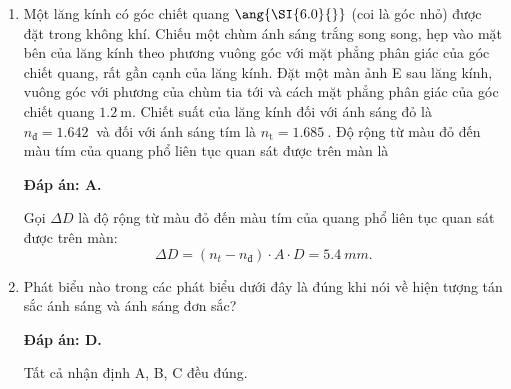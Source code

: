 \begin{enumerate}[label=\bfseries Câu \arabic*:]
{	}
	
	\item {} 
		\cauhoi
	{Một lăng kính có góc chiết quang $\ang{\SI{6.0}{}}$ (coi là góc nhỏ) được đặt trong không khí. Chiếu một chùm ánh sáng trắng song song, hẹp vào mặt bên của lăng kính theo phương vuông góc với mặt phẳng phân giác của góc chiết quang, rất gần cạnh của lăng kính. Đặt một màn ảnh E sau lăng kính, vuông góc với phương của chùm tia tới và cách mặt phẳng phân giác của góc chiết quang $\SI{1.2}{\meter}$. Chiết suất của lăng kính đối với ánh sáng đỏ là $n_\text{đ}=\SI{1.642}{}$ và đối với ánh sáng tím là $n_\text{t}=\SI{1.685}{}$. Độ rộng từ màu đỏ đến màu tím của quang phổ liên tục quan sát được trên màn là
	}
	
	\loigiai
	{		\textbf{Đáp án: A.}
		
Gọi $ \Delta D $ là độ rộng từ màu đỏ đến màu tím của quang phổ liên tục quan sát được trên màn: 
$$
	\Delta D = (n_{t} - n_{\text{đ}})\cdot A \cdot D = \SI{5,4}{mm}.
$$
		
	}
	
	\item {}
		\cauhoi
	{Phát biểu nào trong các phát biểu dưới đây là đúng khi nói về hiện tượng tán sắc ánh sáng và ánh sáng đơn sắc?
	}
	
	\loigiai
	{		\textbf{Đáp án: D.}
		
Tất cả nhận định A, B, C đều đúng.
		
	}
	

\end{enumerate}
